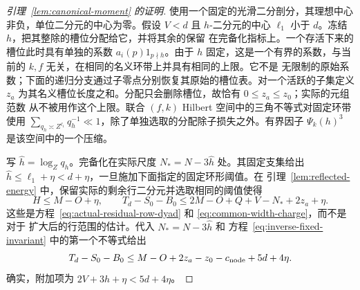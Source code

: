 \documentclass[11pt,a4paper]{article}
\numberwithin{equation}{section}
\numberwithin{figure}{section}
\theoremstyle{definition}
\theoremstyle{remark}
\begin{document}
\begin{proof}[引理~\ref{lem:canonical-moment} 的证明]
使用一个固定的光滑二分剖分，其理想中心非负，单位二分元的中心为零。假设 \(V<d\) 且
\(h\)-二分元的中心 \(\ell_1\) 小于 \(d\)。冻结 \(h\)，把其整除的槽位分配给它，并将其余的保留
在完备化指标上。一个存活下来的槽位此时具有单独的系数 \(a_i(p)1_{p\nmid h}\)。由于 \(h\)
固定，这是一个有界的系数，与当前的 \(k,f\) 无关，在相同的名义环带上并具有相同的上限。它不是
无限制的原始系数；下面的递归分支通过子零点分别恢复其原始的槽位表。对一个活跃的子集定义
\(z_a\) 为其名义槽位长度之和。分配只会删除槽位，故恰有 \(0\le z_a\le z_0\)；实际的元组范数
从不被用作这个上限。联合 \((f,k)\) Hilbert 空间中的三角不等式对固定环带使用
\(\sum_{q_h\asymp Z^{\ell_1}}q_h^{-1}\ll1\)，除了单独选取的分配除子损失之外。有界因子
\(\Psi_k(h)^3\) 是该空间中的一个压缩。

写 \(\widehat h=\log_Zq_h\)。完备化在实际尺度 \(N_*=N-3\widehat h\) 处。其固定支集给出
\(\widehat h\le\ell_1+\eta<d+\eta\)，一旦施加下面指定的固定环形阈值。在
引理~\ref{lem:reflected-energy} 中，保留实际的剩余行二分元并选取相同的阈值使得
\begin{equation}\label{eq:inverse-terminal-width}
 H\le M-O+\eta,\qquad
 T_d-S_0-B_0\le2M-O+Q+V-N_*+2z_a+\eta.
\end{equation}
这些是方程~\eqref{eq:actual-residual-row-dyad} 和 \eqref{eq:common-width-charge}，而不是对于
扩大后的行范围的估计。代入 \(N_*=N-3\widehat h\) 和
方程~\eqref{eq:inverse-fixed-invariant} 中的第一个不等式给出
\begin{equation}\label{old-eq:4.9}
 T_d-S_0-B_0
 \le M-O+2z_a-z_0-c_{\rm node}+5d+4\eta.
\end{equation}
确实，附加项为 \(2V+3\widehat h+\eta<5d+4\eta\)。


\end{proof}
\end{document}
